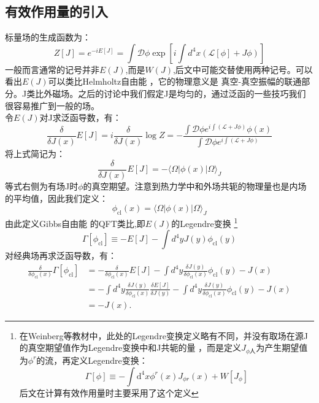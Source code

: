 \documentclass[10pt,openany]{book}
\theoremstyle{thmstyle} %
\theoremstyle{defstyle} %
\theoremstyle{prostyle} %
\begin{document}
\subsection{有效作用量的引入}
 标量场的生成函数为：
 \begin{equation}
  Z[J]=e^{-i E[J]}=\int \mathcal{D} \phi \exp \left[i \int d^4 x(\mathcal{L}[\phi]+J \phi)\right]
 \end{equation}
 一般而言通常的记号并非$ E(J) $,而是$ W(J) $,后文中可能交替使用两种记号。可以看出$ E(J) $可以类比Helmholtz自由能 ，它的物理意义是
 真空-真空振幅的联通部分。J类比外磁场。之后的讨论中我们假定J是均匀的，通过泛函的一些技巧我们很容易推广到一般的场。\\
 令$ E(J) $对J求泛函导数，有：
 \begin{equation}
  \frac{\delta}{\delta J(x)} E[J]=i \frac{\delta}{\delta J(x)} \log Z=-\frac{\int \mathcal{D} \phi e^{i \int(\mathcal{L}+J \phi)} \phi(x)}{\int \mathcal{D} \phi e^{i \int(\mathcal{L}+J \phi)}}
 \end{equation}  
将上式简记为：
\begin{equation}
  \frac{\delta}{\delta J(x)} E[J]=-\langle\Omega|\phi(x)| \Omega\rangle_J
\end{equation}
等式右侧为有场J时$ \phi $的真空期望。注意到热力学中和外场共轭的物理量也是内场的平均值，因此我们定义：
\begin{equation}
  \phi_{\mathrm{cl}}(x)=\langle\Omega|\phi(x)| \Omega\rangle_J
  \label{defofcf}
\end{equation}
由此定义Gibbs自由能 的QFT类比,即$ E(J) $的Legendre变换
\footnote{在Weinberg等教材中，此处的Legendre变换定义略有不同，并没有取场在源J的真空期望值作为Legendre变换中和J共轭的量
，而是定义$ J_{\phi 人} $为产生期望值为$ \phi^r $的流，再定义Legendre变换：
\begin{equation}
  \Gamma[\phi] \equiv-\int \mathrm{d}^4 x \phi^r(x) J_{\phi r}(x)+W\left[J_\phi\right]
  \label{defofw}
\end{equation}  
后文在计算有效作用量时主要采用了这个定义}
\\
\begin{equation}
  \Gamma\left[\phi_{\mathrm{cl}}\right] \equiv-E[J]-\int d^4 y J(y) \phi_{\mathrm{cl}}(y)
  \label{defofea}
\end{equation} 
对经典场再求泛函导数，有：
\begin{equation}
  \begin{aligned}
    \frac{\delta}{\delta \phi_{\mathrm{cl}}(x)} \Gamma\left[\phi_{\mathrm{cl}}\right] & =-\frac{\delta}{\delta \phi_{\mathrm{cl}}(x)} E[J]-\int d^4 y \frac{\delta J(y)}{\delta \phi_{\mathrm{cl}}(x)} \phi_{\mathrm{cl}}(y)-J(x) \\
    & =-\int d^4 y \frac{\delta J(y)}{\delta \phi_{\mathrm{cl}}(x)} \frac{\delta E[J]}{\delta J(y)}-\int d^4 y \frac{\delta J(y)}{\delta \phi_{\mathrm{cl}}(x)} \phi_{\mathrm{cl}}(y)-J(x) \\
    & =-J(x) .
    \end{aligned}
\end{equation}
\end{document}
